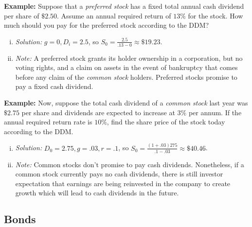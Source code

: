 \textbf{Example: } Suppose that a \textit{preferred stock} has a fixed total annual cash dividend per share of \(\$2.50\). Assume an annual required return of \(13\%\) for the stock. How much should you pay for the preferred stock according to the DDM?
\begin{enumerate}[i.]
    \item \textit{Solution: } \(g= 0 , D_i = 2.5\), so \(S_0 = \frac{2.5}{.13 - 0} \approx \$19.23\).

    \item \textit{Note: } A preferred stock grants its holder ownership in a corporation, but no voting rights, and a claim on assets in the event of bankruptcy that comes before any claim of the \textit{common stock} holders. Preferred stocks promise to pay a fixed cash dividend.
\end{enumerate}

\textbf{Example: } Now, suppose the total cash dividend of a \textit{common stock} last year was \(\$2.75\) per share and dividends are expected to increase at \(3\%\) per annum. If the annual required return rate is \(10\%\), find the share price of the stock today according to the DDM.
\begin{enumerate}[i.]
    \item \textit{Solution: } \(D_0 = 2.75, g=.03, r = .1\), so \(S_0 = \frac{(1+.03)275}{.1-.03} \approx \$40.46\).

    \item \textit{Note: } Common stocks don't promise to pay cash dividends. Nonetheless, if a common stock currently pays no cash dividends, there is still investor expectation that earnings are being reinvested in the company to create growth which will lead to cash dividends in the future.
\end{enumerate}

\subsection{Bonds}
